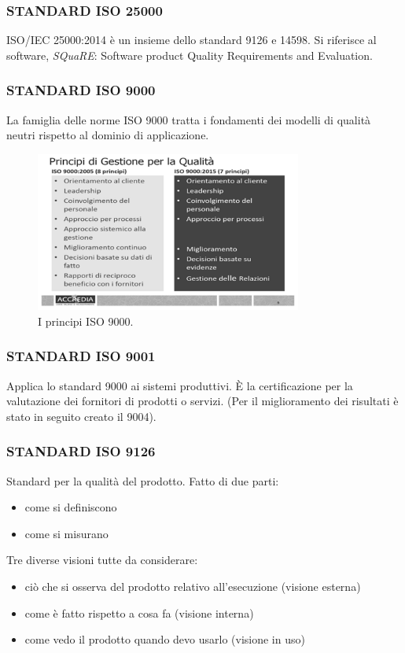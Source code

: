			\subsubsection{STANDARD ISO 25000}		\label{2500}
			ISO/IEC 25000:2014 è un insieme dello standard 9126 e 14598.
			Si riferisce al software, \textit{SQuaRE}: Software product Quality Requirements and Evaluation.


			\subsubsection{STANDARD ISO 9000}		\label{9000}
			La famiglia delle norme ISO 9000 tratta i fondamenti dei modelli di qualità neutri rispetto al dominio di applicazione.

			\begin{figure}[H]
				\centering
				\includegraphics[width=0.78\textwidth]{img/9000}
				\caption{I principi ISO 9000.}
			\end{figure}


			\subsubsection{STANDARD ISO 9001}		\label{9001}
			Applica lo standard 9000 ai sistemi produttivi. È la certificazione per la valutazione dei fornitori di prodotti o servizi. (Per il miglioramento dei risultati è stato in seguito creato il 9004).


			\subsubsection{STANDARD ISO 9126}		\label{9126} %
			Standard per la qualità del prodotto.
			Fatto di due parti:
				\begin{itemize}
					\item come si definiscono
					\item come si misurano
				\end{itemize}
			Tre diverse visioni tutte da considerare:
				\begin{itemize}
					\item ciò che si osserva del prodotto relativo all'esecuzione (visione esterna)
					\item come è fatto rispetto a cosa fa (visione interna)
					\item come vedo il prodotto quando devo usarlo (visione in uso)
				\end{itemize}

